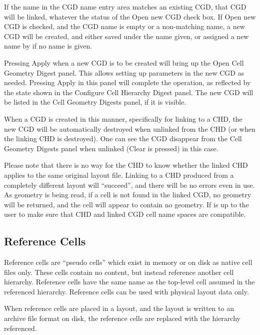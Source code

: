 If the name in the {\cb CGD name} entry area matches an existing CGD,
that CGD will be linked, whatever the status of the {\cb Open new CGD}
check box.  If {\cb Open new CGD} is checked, and the {\cb CGD name}
is empty or a non-matching name, a new CGD will be created, and either
saved under the name given, or assigned a new name by {\Xic} if no
name is given.

Pressing {\cb Apply} when a new CGD is to be created will bring up the
{\cb Open Cell Geometry Digest} panel.  This allows setting up
parameters in the new CGD as needed.  Pressing {\cb Apply} in this
panel will complete the operation, as reflected by the state shown in
the {\cb Configure Cell Hierarchy Digest} panel.  The new CGD will be
listed in the {\cb Cell Geometry Digests} panel, if it is visible.

When a CGD is created in this manner, specifically for linking to a
CHD, the new CGD will be automatically destroyed when unlinked from
the CHD (or when the linking CHD is destroyed).  One can see the CGD
disappear from the {\cb Cell Geometry Digests} panel when unlinked
({\cb Clear} is pressed) in this case.

Please note that there is no way for the CHD to know whether the
linked CHD applies to the same original layout file.  Linking to a CHD
produced from a completely different layout will ``succeed'', and there
will be no errors even in use.  As geometry is being read, if a cell
is not found in the linked CGD, no geometry will be returned, and the
cell will appear to contain no geometry.  If is up to the user to make
sure that CHD and linked CGD cell name spaces are compatible.


\subsection{Reference Cells}
\label{refcell}
Reference cells are ``pseudo cells'' which exist in memory or on disk
as native cell files only.  These cells contain no content, but
instead reference another cell hierarchy.  Reference cells have the
same name as the top-level cell assumed in the referenced hierarchy. 
Reference cells can be used with physical layout data only.

When reference cells are placed in a layout, and the layout is written
to an archive file format on disk, the reference cells are replaced
with the hierarchy referenced.

